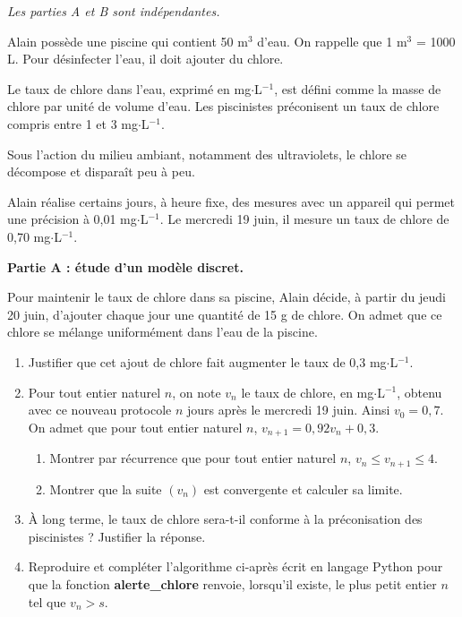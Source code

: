 \documentclass[11pt,fleqn, openany]{book} %
\begin{document}
\begin{exercise}[subtitle={(Métropole 2024)}]
\textit{Les parties A et B sont indépendantes.}

Alain possède une piscine qui contient 50 m$^3$ d'eau. On rappelle que 1 m$^3$ = 1000 L. Pour désinfecter l'eau, il doit ajouter du chlore. 

Le taux de chlore dans l'eau, exprimé en mg$\cdot$L$^{-1}$, est défini comme la masse de chlore par unité de volume d'eau. Les piscinistes préconisent un taux de chlore compris entre 1 et 3 mg$\cdot$L$^{-1}$.

Sous l'action du milieu ambiant, notamment des ultraviolets, le chlore se décompose et disparaît peu à peu.

Alain réalise certains jours, à heure fixe, des mesures avec un appareil qui permet une précision à 0,01 mg$\cdot$L$^{-1}$. Le mercredi 19 juin, il mesure un taux de chlore de 0,70 mg$\cdot$L$^{-1}$.

\textbf{Partie A : étude d'un modèle discret.}

Pour maintenir le taux de chlore dans sa piscine, Alain décide, à partir du jeudi 20 juin, d'ajouter chaque jour une quantité de 15 g de chlore. On admet que ce chlore se mélange uniformément dans l'eau de la piscine.
\begin{enumerate}
\item Justifier que cet ajout de chlore fait augmenter le taux de 0,3 mg$\cdot$L$^{-1}$.
\item Pour tout entier naturel $n$, on note $v_n$ le taux de chlore, en mg$\cdot$L$^{-1}$, obtenu avec ce nouveau protocole $n$ jours après le mercredi 19 juin. Ainsi $v_0 = 0,7$.\\
On admet que pour tout entier naturel $n$, $v_{n+1} = 0,92v_n +0,3$.
\begin{enumerate}
\item Montrer par récurrence que pour tout entier naturel $n$, $v_n \leqslant v_{n+1} \leqslant 4$.
\item Montrer que la suite $(v_n)$ est convergente et calculer sa limite.\end{enumerate}
\item À long terme, le taux de chlore sera-t-il conforme à la préconisation des piscinistes ? Justifier la réponse.
\item Reproduire et compléter l'algorithme ci-après écrit en langage Python pour que
la fonction \textbf{alerte\_chlore} renvoie, lorsqu'il existe, le plus petit entier $n$ tel que $v_n > s$.


\end{enumerate}
\end{exercise}
\end{document}
